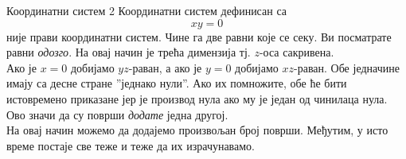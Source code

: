 \begin{surferPage}{Координатни систем 2}
Координатни систем дефинисан са  
\[xy=0\]
није прави координатни систем. Чине га две равни које се секу. Ви посматрате равни {\it одозго}. На овај начин је трећа димензија тј. $z$-оса сакривена. \\
\vspace{0.3cm}
Ако је $x=0$ добијамо $yz$-раван, а ако је $y=0$ добијамо $xz$-раван.
Обе једначине имају са десне стране ''једнако нули''. Ако их помножите, обе ће бити истовремено приказане јер је производ нула ако му је један од чинилаца нула. Ово значи да су површи  {\it додате} једна другој. \\
На овај начин можемо да додајемо произвољан број површи. Међутим, у исто време постаје све теже и теже да их израчунавамо.
\end{surferPage}
